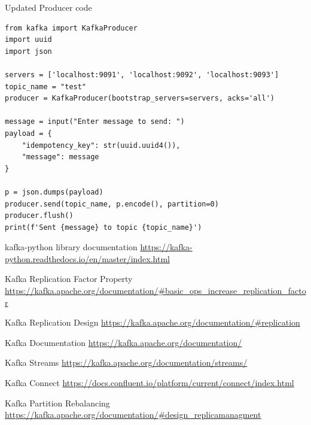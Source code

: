 \documentclass[11pt]{article}
\begin{document}
Updated Producer code
\begin{adjustwidth}{-30pt}{0pt}
\begin{Verbatim}
from kafka import KafkaProducer
import uuid
import json

servers = ['localhost:9091', 'localhost:9092', 'localhost:9093']
topic_name = "test"
producer = KafkaProducer(bootstrap_servers=servers, acks='all')

message = input("Enter message to send: ")
payload = {
    "idempotency_key": str(uuid.uuid4()),
    "message": message
}

p = json.dumps(payload)
producer.send(topic_name, p.encode(), partition=0)
producer.flush()
print(f'Sent {message} to topic {topic_name}')

\end{Verbatim}
\end{adjustwidth}

\clearpage

\begin{thebibliography}{9}
 kafka-python library documentation
\newline
\url{https://kafka-python.readthedocs.io/en/master/index.html}

 Kafka Replication Factor Property
\newline
\url{https://kafka.apache.org/documentation/#basic_ops_increase_replication_factor}

 Kafka Replication Design
\newline
\url{https://kafka.apache.org/documentation/#replication}

 Kafka Documentation
\newline
\url{https://kafka.apache.org/documentation/}

 Kafka Streams
\newline
\url{https://kafka.apache.org/documentation/streams/}

 Kafka Connect
\newline
\url{https://docs.confluent.io/platform/current/connect/index.html}


 Kafka Partition Rebalancing
\newline
\url{https://kafka.apache.org/documentation/#design_replicamanagment}


\end{thebibliography}
\end{document}
